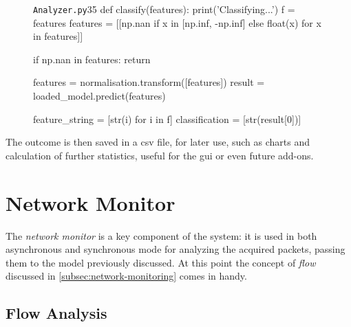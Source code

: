 \begin{figure}[h!]
    \begin{code}[colback=white]{\texttt{Analyzer.py}}{35}
def classify(features):
print('Classifying...')
f = features
features = [[np.nan if x in [np.inf, -np.inf]
                else float(x) for x in features]]

if np.nan in features:
    return

features = normalisation.transform([features])
result = loaded_model.predict(features)

feature_string = [str(i) for i in f]
classification = [str(result[0])]
\end{code}
\end{figure}

\noindent The outcome is then saved in a \gls{csv} file, for later use, such as charts and calculation of further statistics, useful for the \gls{gui} or even future add-ons. 


\section{Network Monitor}
\label{sec:monitor-implementation}

The \textit{network monitor} is a key component of the system: it is used in both asynchronous and synchronous mode for analyzing the acquired packets, passing them to the model previously discussed. At this point the concept of \textit{flow} discussed in \ref{subsec:network-monitoring} comes in handy.


\subsection{Flow Analysis}
\label{subsec:flow-analysis}

